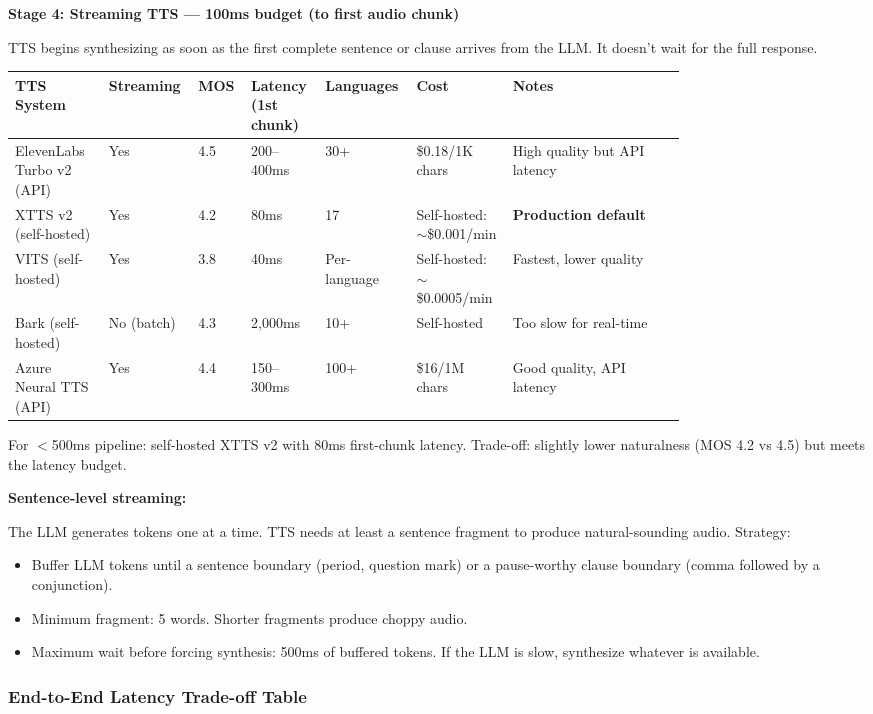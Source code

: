 \textbf{Stage 4: Streaming TTS --- 100ms budget (to first audio chunk)}

TTS begins synthesizing as soon as the first complete sentence or clause arrives from the LLM. It doesn't wait for the full response.

{\small
\begin{tabular}{|p{0.13\linewidth}|p{0.07\linewidth}|p{0.05\linewidth}|p{0.09\linewidth}|p{0.08\linewidth}|p{0.12\linewidth}|p{0.24\linewidth}|}
\hline
\textbf{TTS System} & \textbf{Streaming} & \textbf{MOS} & \textbf{Latency (1st chunk)} & \textbf{Languages} & \textbf{Cost} & \textbf{Notes} \\
\hline
ElevenLabs Turbo v2 (API) & Yes & 4.5 & 200--400ms & 30+ & \$0.18/1K chars & High quality but API latency \\
\hline
XTTS v2 (self-hosted) & Yes & 4.2 & 80ms & 17 & Self-hosted: $\sim$\$0.001/min & \textbf{Production default} \\
\hline
VITS (self-hosted) & Yes & 3.8 & 40ms & Per-language & Self-hosted: $\sim$\$0.0005/min & Fastest, lower quality \\
\hline
Bark (self-hosted) & No (batch) & 4.3 & 2,000ms & 10+ & Self-hosted & Too slow for real-time \\
\hline
Azure Neural TTS (API) & Yes & 4.4 & 150--300ms & 100+ & \$16/1M chars & Good quality, API latency \\
\hline
\end{tabular}
}

\bigskip
For $<$500ms pipeline: self-hosted XTTS v2 with 80ms first-chunk latency. Trade-off: slightly lower naturalness (MOS 4.2 vs 4.5) but meets the latency budget.

\textbf{Sentence-level streaming:}

The LLM generates tokens one at a time. TTS needs at least a sentence fragment to produce natural-sounding audio. Strategy:
\begin{itemize}
  \item Buffer LLM tokens until a sentence boundary (period, question mark) or a pause-worthy clause boundary (comma followed by a conjunction).
  \item Minimum fragment: 5 words. Shorter fragments produce choppy audio.
  \item Maximum wait before forcing synthesis: 500ms of buffered tokens. If the LLM is slow, synthesize whatever is available.
\end{itemize}

\subsubsection*{End-to-End Latency Trade-off Table}

